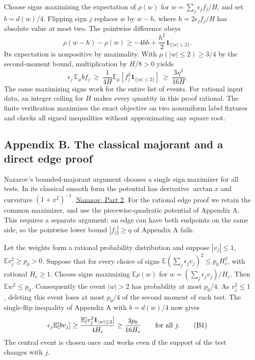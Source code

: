 \documentclass[
  11pt,
]{article}
\begin{document}
Choose signs maximizing the expectation of \(\rho(w)\) for
\(w=\sum_j\epsilon_j f_j/H\), and set \(b=d(w)/4\). Flipping sign \(j\)
replaces \(w\) by \(w-h\), where \(h=2\epsilon_j f_j/H\) has absolute
value at most two. The pointwise difference obeys \[
 \rho(w-h)-\rho(w)\ge -4bh + \frac{h^2}{2}\mathbf1_{\{|w|\le2\}} .
\] Its expectation is nonpositive by maximality. With
\(\mu(|w|\le2)\ge3/4\) by the second-moment bound, multiplication by
\(H/8>0\) yields \[
 \epsilon_j\,\mathbb E_\mu bf_j
       \ \ge\ \frac1{4H}\mathbb E_\mu
                         [f_j^2\mathbf1_{\{|w|\le2\}}]
       \ \ge\ \frac{3\eta^2}{16H}.
\] The same maximizing signs work for the entire list of events. For rational input data, an integer ceiling for \(H\) makes
every quantity in this proof rational. The finite verification maximizes
the exact objective on two nonuniform label fixtures and checks all
signed inequalities without approximating any square root.

\clearpage
\subsection{Appendix B. The classical majorant and a direct edge
proof}\label{appendix-b.-the-classical-majorant-and-a-direct-edge-proof}

Nazarov's bounded-majorant argument chooses a single sign maximizer
for all tests. In its classical smooth form the potential has derivative
\(\arctan x\) and curvature \((1+x^2)^{-1}\).
\href{https://www.mathnet.ru/eng/aa774}{Nazarov, Part 2}.
For the rational edge proof we retain the common maximizer, and use
the piecewise-quadratic potential of Appendix A. This requires a separate
argument: an edge can have both endpoints on the same side, so the
pointwise lower bound \(|f_j|\ge\eta\) of Appendix A fails.

Let the weights form a rational probability distribution and suppose
\(|v_j|\le1\), \(\mathbb E v_j^2\ge p_0>0\). Suppose that for every choice
of signs \(\mathbb E(\sum_j\epsilon_jv_j)^2\le p_0 H_e^2\), with rational
\(H_e\ge1\). Choose signs maximizing \(\mathbb E\rho(w)\) for
\(w=(\sum_j\epsilon_jv_j)/H_e\). Then \(\mathbb E w^2\le p_0\).
Consequently the event \(|w|>2\) has probability at most \(p_0/4\).
As \(v_j^2\le1\), deleting this event loses at most \(p_0/4\) of the
second moment of each test. The single-flip inequality of Appendix A
with \(b=d(w)/4\) now gives
\[
 \epsilon_j\mathbb E[bv_j]\ge
 \frac{\mathbb E[v_j^2{\bf1}_{|w|\le2}]}{4H_e}
 \ge\frac{3p_0}{16H_e}\qquad\text{for all }j. \tag{B1}
\]
The central event is chosen once and works even if the support of the
test changes with \(j\).
\end{document}

